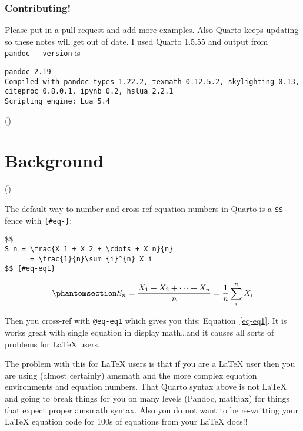 \documentclass[
  letterpaper,
  DIV=11,
  numbers=noendperiod]{scrreprt}
\begin{document}
\subsection*{Contributing!}\label{contributing}

Please put in a pull request and add more examples. Also Quarto keeps
updating so these notes will get out of date. I used Quarto 1.5.55 and
output from \texttt{pandoc\ -\/-version} is

\begin{verbatim}
pandoc 2.19
Compiled with pandoc-types 1.22.2, texmath 0.12.5.2, skylighting 0.13,
citeproc 0.8.0.1, ipynb 0.2, hslua 2.2.1
Scripting engine: Lua 5.4
\end{verbatim}

{()}


\chapter{Background}\label{background}

{(\nextSection)}

The default way to number and cross-ref equation numbers in Quarto is a
\texttt{\$\$} fence with \texttt{\{\#eq-\}}:

\begin{verbatim}
$$
S_n = \frac{X_1 + X_2 + \cdots + X_n}{n}
      = \frac{1}{n}\sum_{i}^{n} X_i
$$ {#eq-eq1}
\end{verbatim}

\begin{equation}\phantomsection\label{eq-eq1}{
S_n = \frac{X_1 + X_2 + \cdots + X_n}{n}
      = \frac{1}{n}\sum_{i}^{n} X_i
}\end{equation}

Then you cross-ref with \texttt{@eq-eq1} which gives you this:
Equation~\ref{eq-eq1}. It is works great with single equation in display
math\ldots and it causes all sorts of problems for LaTeX users.

The problem with this for LaTeX users is that if you are a LaTeX user
then you are using (almost certainly) amsmath and the more complex
equation environments and equation numbers. That Quarto syntax above is
not LaTeX and going to break things for you on many levels (Pandoc,
mathjax) for things that expect proper amsmath syntax. Also you do not
want to be re-writting your LaTeX equation code for 100s of equations
from your LaTeX docs!!
\end{document}
